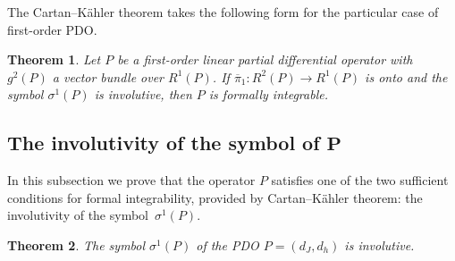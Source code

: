 \documentclass[11pt]{article}
\newtheorem{theorem}{Theorem}
\begin{document}
The Cartan--K\"ahler theorem \cite{grifone00} takes the following form
for the particular case of f\/irst-order PDO.

\begin{theorem}
Let $P$ be a first-order linear partial differential operator with
$g^{2}(P)$ a vector bundle over $R^{1}(P)$. If $\overline{\pi}_{1}:R^{2}(P)\to R^{1}(P)$
is onto and the symbol $\sigma^{1}(P)$ is involutive, then $P$ is
formally integrable.
\end{theorem}

\subsection[The involutivity of the symbol of $P$]{The involutivity of the symbol of $\boldsymbol{P}$}

In this subsection we prove that the operator $P$ satisf\/ies one of
the two suf\/f\/icient conditions for formal integrability, provided by
Cartan--K\"ahler theorem: the involutivity of the symbol~$\sigma^{1}(P)$.

\begin{theorem}\label{thm:-involutivity}
The symbol $\sigma^{1}(P)$ of the PDO
$P=(d_{J},d_{h})$ is involutive.
\end{theorem}
\end{document}
